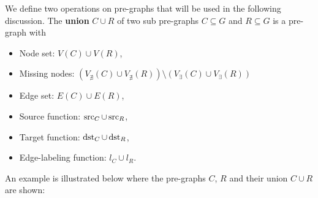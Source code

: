 We define two operations on pre-graphs that will be used in the following discussion.
The \textbf{union} $C \cup R$ of two sub pre-graphs $C \subseteq G$ and $R \subseteq G$ is a pre-graph with 
\begin{itemize}
    \item Node set: $ V(C) \cup V(R) $,
    \item Missing nodes:
        $(
            V_{\nexists}(C) \cup V_{\nexists}(R)) \setminus 
            (   V_\exists(C) \cup 
             V_\exists(R)  
                   )$
    \item Edge set: $ E(C) \cup E(R) $, 
    \item Source function: $ \operatorname{src}_C \cup \operatorname{src}_R $,  
    \item Target function: $ \operatorname{dst}_C \cup \operatorname{dst}_R $,  
    \item Edge-labeling function: $ l_C \cup l_R $.   
\end{itemize} 
An example is illustrated below where the pre-graphs $C$, $R$ and their union $C \cup R$ are shown:
